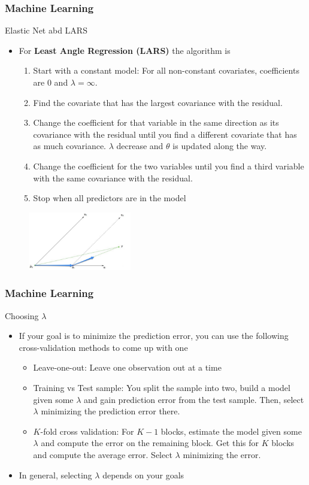 \documentclass{beamer}
\begin{document}
\begin{frame}
\frametitle{Machine Learning}
Elastic Net abd LARS
\begin{itemize}
\item For \textbf{Least Angle Regression (LARS)} the algorithm is 
\begin{enumerate}
\item Start with a constant model: For all non-constant covariates, coefficients are 0 and $\lambda=\infty$. 
\item Find the covariate that has the largest covariance with the residual. 
\item Change the coefficient for that variable in the same direction as its covariance with the residual until you find a different covariate that has as much covariance.  $\lambda$ decrease and $\theta$ is updated along the way.
\item Change the coefficient for the two variables until you find a third variable with the same covariance with the residual. 
\item Stop when all predictors are in the model
\end{enumerate}
\end{itemize}
\begin{figure}[H]
\centering
\includegraphics[width=0.4\textwidth, keepaspectratio]{lars.png}
\end{figure}
\end{frame}

\begin{frame}
\frametitle{Machine Learning}
Choosing $\lambda$
\begin{itemize}
\item  If your goal is to minimize the prediction error, you can use the following cross-validation methods to come up with one
\begin{itemize}
\item Leave-one-out: Leave one observation out at a time
\item Training vs Test sample: You split the sample into two, build a model given some $\lambda$ and gain prediction error from the test sample. Then, select $\lambda$ minimizing the prediction error there.
\item $K$-fold cross validation:  For $K-1$ blocks, estimate the model given some $\lambda$ and compute the error on the remaining block. Get this for $K$ blocks and compute the average error. Select $\lambda$ minimizing the error. 
\end{itemize}
\item In general, selecting $\lambda$ depends on your goals
\end{itemize}
\end{frame}
\end{document}
